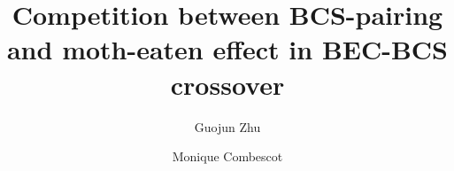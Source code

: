 \documentclass[3p,twocolumn]{elsarticle}
\begin{document}
\title{Competition between BCS-pairing and moth-eaten effect in BEC-BCS crossover}
\author[uiuc]{Guojun Zhu}
\author[uiuc,upmc]{Monique Combescot}

\address[uiuc]{Department of Physics, University of Illinois at Urbana-Champaign, 1110 W Green St, Urbana, IL, 61801}

\address[upmc]{Institut des NanoSciences de Paris, Universite Pierre et Marie Curie, CNRS, Tour 22, 4 place Jussieu, 75005 Paris }
%
\newcommand{\vk}{\ensuremath{\mathbf{k}}}
\newcommand{\vK}{\ensuremath{\mathbf{K}}}
\providecommand{\vr}{\ensuremath{\mathbf{r}}}

\newcommand{\gk}{\ensuremath{{g}(\mathbf{k})}}

\newcommand{\vp}{\ensuremath{\mathbf{p}}}
\newcommand{\gp}{\ensuremath{{g}(\mathbf{p})}}

\newcommand{\vq}{\ensuremath{\mathbf{q}}}

\newcommand{\Fo}{\ensuremath{\mathbf{F_0}}}


\newcommand{\E}{\ensuremath{\mathbf{E}}}
\newcommand{\A}{\ensuremath{\mathbf{A}}}
\newcommand{\J}{\ensuremath{\mathcal{J}}}

\newcommand{\ket}[1]{\ensuremath{\left|#1\right>}}
\newcommand{\bra}[1]{\ensuremath{\left<#1\right|}}

\newcommand{\twoe}{\ensuremath{2\epsilon_\vk-\E_1}}

\newcommand{\nth}[1]{\ensuremath{\frac{1}{#1}}}

\newcommand{\br}[1]{\ensuremath{\left(#1\right)}}
\newcommand{\mbr}[1]{\ensuremath{\left[#1\right]}}
\newcommand{\bbr}[1]{\ensuremath{\left\{#1\right\}}}


\newcommand{\tk}{\ensuremath{\tilde{k}}}

\newcommand{\kp}{\ensuremath{\ket{\Psi}}}

\newcommand{\av}[1]{\ensuremath{\bigl<{#1}\bigr>}}
\newcommand{\avs}[3] {\av{#1{\lvert{#2}\rvert}#3}}
\newcommand{\avv}[2][\nu] {\avs{#1}{#2}{#1}}
\newcommand{\avt}[2]{\av{{#1}|{#2}}}
\newcommand{\avtu}[1]{\av{T_\tau#1}}
\end{document}
